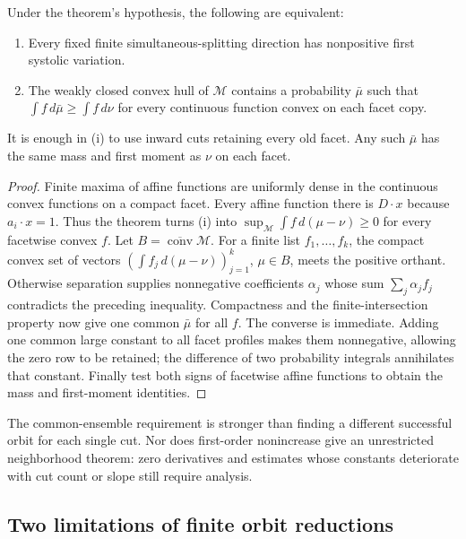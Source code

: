 \begin{corollary}\label{cor:mc-convex-order}
Under the theorem's hypothesis, the following are equivalent:
\begin{enumerate}[label=\textup{(\roman*)}]
\item Every fixed finite simultaneous-splitting direction has nonpositive
first systolic variation.
\item The weakly closed convex hull of $\mathcal M$ contains a probability
$\bar\mu$ such that
$\int f\,d\bar\mu\geq\int f\,d\nu$ for every continuous function convex
on each facet copy.
\end{enumerate}
It is enough in \textup{(i)} to use inward cuts retaining every old facet.
Any such $\bar\mu$ has the same mass and first moment as $\nu$ on each facet.
\end{corollary}
\begin{proof}
Finite maxima of affine functions are uniformly dense in the continuous
convex functions on a compact facet. Every affine function there is $D\cdot x$
because $a_i\cdot x=1$. Thus the theorem turns (i) into
$\sup_{\mathcal M}\int f\,d(\mu-\nu)\geq0$ for every facetwise convex $f$.
Let $B=\overline{\operatorname{conv}}\mathcal M$. For a finite list
$f_1,\ldots,f_k$, the compact convex set of vectors
$(\int f_j\,d(\mu-\nu))_{j=1}^k$, $\mu\in B$, meets the positive orthant.
Otherwise separation supplies nonnegative coefficients $\alpha_j$ whose
sum $\sum_j\alpha_jf_j$ contradicts the preceding inequality.
Compactness and the finite-intersection property now give one common
$\bar\mu$ for all $f$. The converse is immediate.
Adding one common large constant to all facet profiles makes them
nonnegative, allowing the zero row to be retained; the difference of two
probability integrals annihilates that constant. Finally test both signs of
facetwise affine functions to obtain the mass and first-moment identities.
\end{proof}

The common-ensemble requirement is stronger than finding a different
successful orbit for each single cut. Nor does first-order nonincrease give
an unrestricted neighborhood theorem: zero derivatives and estimates whose
constants deteriorate with cut count or slope still require analysis.

\subsection{Two limitations of finite orbit reductions}

